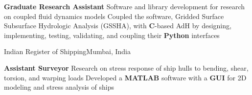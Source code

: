 \documentclass[letterpaper,10pt]{article}
\begin{document}
      \resumeSubSubheading
       {\textbf{Graduate Research Assistant}}{}
       \resumeItemListStart
            {Software and library development for research on coupled
            fluid dynamics models}
            {Coupled the \textbf{\CC{}} software, Gridded Surface Subsurface
            Hydrologic Analysis (GSSHA), with \textbf{C}-based AdH by
            designing, implementing, testing, validating, and coupling their
            \textbf{Python} interfaces}
       \resumeItemListEnd

    \resumeSubheading
      {Indian Register of Shipping}{Mumbai, India}

      \resumeSubSubheading
        {\textbf{Assistant Surveyor}}{}
        \resumeItemListStart
            {Research on stress response of ship hulls to bending, shear,
            torsion, and warping loads}
            {Developed a \textbf{MATLAB} software with a \textbf{GUI} for 2D
            modeling and stress analysis of ships}
        \resumeItemListEnd



\end{document}
